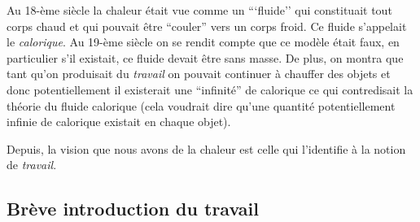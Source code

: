 \documentclass[a4paper,12pt]{book}
\begin{document}
Au 18-ème siècle la chaleur était vue comme un ```fluide''
qui constituait tout corps chaud et qui pouvait être ``couler''
vers un corps froid. Ce fluide s'appelait le \textit{calorique}. 
Au 19-ème siècle on se rendit compte que ce modèle était faux, en particulier s'il existait, ce fluide devait être sans masse. De plus, on montra que tant qu'on produisait du \textit{travail}
on pouvait continuer à chauffer des objets et donc potentiellement il existerait une ``infinité'' de calorique
ce qui contredisait la théorie du fluide calorique (cela voudrait dire qu'une quantité potentiellement infinie de calorique existait en chaque objet). 

Depuis, la vision que nous avons de la chaleur est celle qui 
l'identifie à la notion de \textit{travail}. 

\subsection{Brève introduction du travail}
\end{document}
